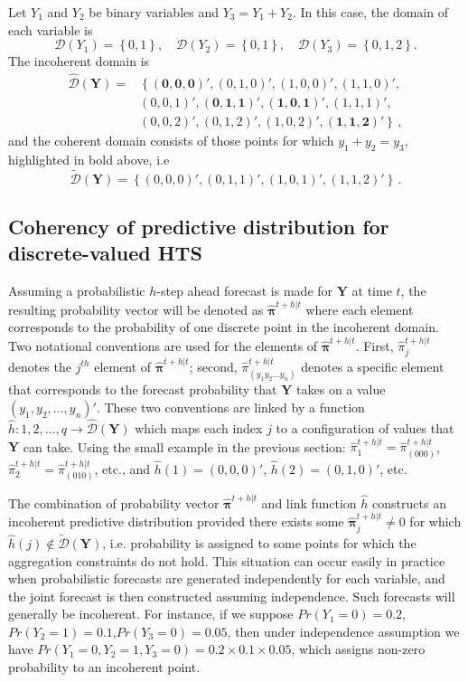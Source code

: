 \documentclass[a4paper,review,12pt,authoryear]{elsarticle}
\newcommand{\bY}{\mathbf{Y}}
\newcommand{\bpi}{\bm{\pi}}
\begin{document}
  Let $Y_1$ and $Y_2$ be binary variables and $Y_3=Y_1+Y_2$. In this case, the domain of each variable is
  \[
    \mathcal{D}(Y_1)=\left\{0,1\right\},\quad
    \mathcal{D}(Y_2)=\left\{0,1\right\},\quad
    \mathcal{D}(Y_3)=\left\{0,1,2\right\}.
  \]   
  The incoherent domain is
  \begin{align*}
  \hat{\mathcal D}(\bY)=&\left\{\mathbf{(0,0,0)'},(0,1,0)',(1,0,0)',(1,1,0)',\right.\\
  &\left.(0,0,1)',\mathbf{(0,1,1)'},\mathbf{(1,0,1)'},(1,1,1)',\right.\\
  &\left.(0,0,2)',(0,1,2)',(1,0,2)',\mathbf{(1,1,2)'}\right\}\,,
  \end{align*}
  and the coherent domain consists of those points for which $y_1+y_2=y_3$, highlighted in bold above, i.e
  \[
      \tilde{\mathcal D}(\bY)=\left\{(0,0,0)',(0,1,1)',(1,0,1)',(1,1,2)'\right\}\,.
  \]
    
  \subsection{Coherency of predictive distribution for discrete-valued HTS}
  
  \label{sec:coherent_df}

  Assuming a probabilistic $h$-step ahead forecast is made for $\bY$ at time $t$, the resulting probability vector will be denoted as $\hat{\bpi}^{t+h|t}$ where each element corresponds to the probability of one discrete point in the incoherent domain. 
  Two notational conventions are used for the elements of $\hat{\bpi}^{t+h|t}$.
  First, $\hat{\pi}_j^{t+h|t}$ denotes the $j^{th}$ element of $\hat{\bpi}^{t+h|t}$;  
  second, $\hat{\pi}_{(y_1 y_2 \dots y_n)}^{t+h|t}$ denotes a specific element that corresponds to the forecast probability that $\bY$ takes on a value $(y_1,y_2,\dots,y_n)'$. These two conventions are linked by a function $\hat{h}:{1,2,\dots,q}\rightarrow\hat{\mathcal{D}}(\bY)$ which maps each index $j$ to a configuration of values that $\bY$ can take. 
  Using the small example in the previous section: $\hat{\pi}_1^{t+h|t}=\hat{\pi}_{(000)}^{t+h|t}$, $\hat{\pi}_2^{t+h|t}=\hat{\pi}_{(010)}^{t+h|t}$, etc., and $\hat{h}(1)=(0,0,0)'$, $\hat{h}(2)=(0,1,0)'$, etc.
  
  The combination of probability vector $\hat{\bpi}^{t+h|t}$ and link function $\hat h$ constructs an incoherent predictive distribution provided there exists some $\hat{\bpi}^{t+h|t}_j\neq 0$ for which $\hat{h}(j)\notin\tilde{\mathcal{D}}(\bY)$, i.e. probability is assigned to some points for which the aggregation constraints do not hold. 
  This situation can occur easily in practice when probabilistic forecasts are generated independently for each variable, and the joint forecast is then constructed assuming independence. 
  Such forecasts will generally be incoherent. 
  For instance, if we suppose $Pr(Y_1=0)=0.2$,$Pr(Y_2=1)=0.1$,$Pr(Y_3=0)=0.05$, then under independence assumption we have $Pr(Y_1=0,Y_2=1,Y_3=0)=0.2\times0.1\times0.05$, which assigns non-zero probability to an incoherent point.
  
\end{document}
